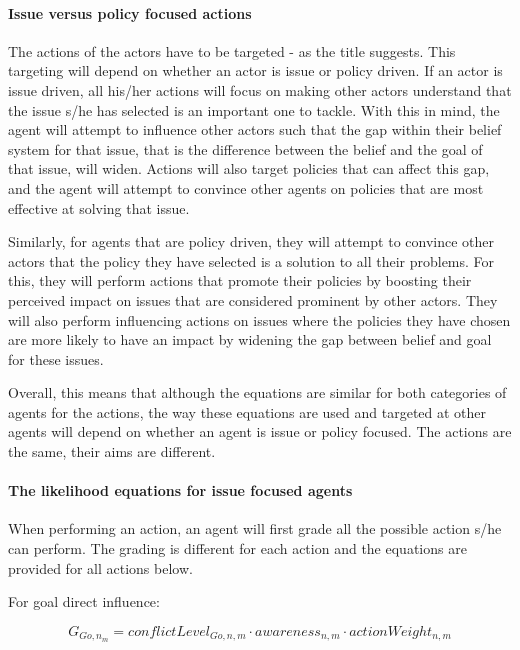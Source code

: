 \documentclass[11pt]{article}
\begin{document}
\paragraph{Issue versus policy focused actions}
\label{sssec:}

The actions of the actors have to be targeted - as the title suggests. This targeting will depend on whether an actor is issue or policy driven. If an actor is issue driven, all his/her actions will focus on making other actors understand that the issue s/he has selected is an important one to tackle. With this in mind, the agent will attempt to influence other actors such that the gap within their belief system for that issue, that is the difference between the belief and the goal of that issue, will widen. Actions will also target policies that can affect this gap, and the agent will attempt to convince other agents on policies that are most effective at solving that issue.

Similarly, for agents that are policy driven, they will attempt to convince other actors that the policy they have selected is a solution to all their problems. For this, they will perform actions that promote their policies by boosting their perceived impact on issues that are considered prominent by other actors. They will also perform influencing actions on issues where the policies they have chosen are more likely to have an impact by widening the gap between belief and goal for these issues.

Overall, this means that although the equations are similar for both categories of agents for the actions, the way these equations are used and targeted at other agents will depend on whether an agent is issue or policy focused. The actions are the same, their aims are different.


\paragraph{The likelihood equations for issue focused agents}
\label{sssec:}

When performing an action, an agent will first grade all the possible action s/he can perform. The grading is different for each action and the equations are provided for all actions below.

For goal direct influence:

\begin{equation}\label{eq:likelihoodAimChange}
G_{Go, n_m} = conflictLevel_{Go, n, m} \cdot awareness_{n,m} \cdot actionWeight_{n,m}
\end{equation}
\end{document}
